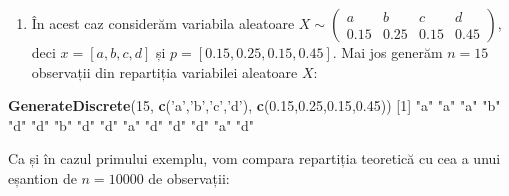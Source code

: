\documentclass[]{article}
\newenvironment{Shaded}{\begin{snugshade}}{\end{snugshade}}
\newcommand{\DecValTok}[1]{\textcolor[rgb]{0.00,0.00,0.81}{#1}}
\newcommand{\FloatTok}[1]{\textcolor[rgb]{0.00,0.00,0.81}{#1}}
\newcommand{\KeywordTok}[1]{\textcolor[rgb]{0.13,0.29,0.53}{\textbf{#1}}}
\newcommand{\NormalTok}[1]{#1}
\newcommand{\StringTok}[1]{\textcolor[rgb]{0.31,0.60,0.02}{#1}}
\providecommand{\tightlist}{%
  \setlength{\itemsep}{0pt}\setlength{\parskip}{0pt}}
\begin{document}
\begin{enumerate}
\def\labelenumi{\arabic{enumi}.}
\setcounter{enumi}{1}
\tightlist
\item
  În acest caz considerăm variabila aleatoare
  \(X\sim\begin{pmatrix}a & b & c & d\\ 0.15 & 0.25 & 0.15 & 0.45\end{pmatrix}\),
  deci \(x=[a,b,c,d]\) și \(p=[0.15,0.25,0.15,0.45]\). Mai jos generăm
  \(n = 15\) observații din repartiția variabilei aleatoare \(X\):
\end{enumerate}

\begin{Shaded}
\begin{Highlighting}[]
\KeywordTok{GenerateDiscrete}\NormalTok{(}\DecValTok{15}\NormalTok{, }\KeywordTok{c}\NormalTok{(}\StringTok{'a'}\NormalTok{,}\StringTok{'b'}\NormalTok{,}\StringTok{'c'}\NormalTok{,}\StringTok{'d'}\NormalTok{), }\KeywordTok{c}\NormalTok{(}\FloatTok{0.15}\NormalTok{,}\FloatTok{0.25}\NormalTok{,}\FloatTok{0.15}\NormalTok{,}\FloatTok{0.45}\NormalTok{))}
\NormalTok{ [}\DecValTok{1}\NormalTok{] }\StringTok{"a"} \StringTok{"a"} \StringTok{"a"} \StringTok{"b"} \StringTok{"d"} \StringTok{"d"} \StringTok{"b"} \StringTok{"d"} \StringTok{"d"} \StringTok{"a"} \StringTok{"d"} \StringTok{"d"} \StringTok{"d"} \StringTok{"a"} \StringTok{"d"}
\end{Highlighting}
\end{Shaded}

Ca și în cazul primului exemplu, vom compara repartiția teoretică cu cea
a unui eșantion de \(n = 10000\) de observații:
\end{document}
